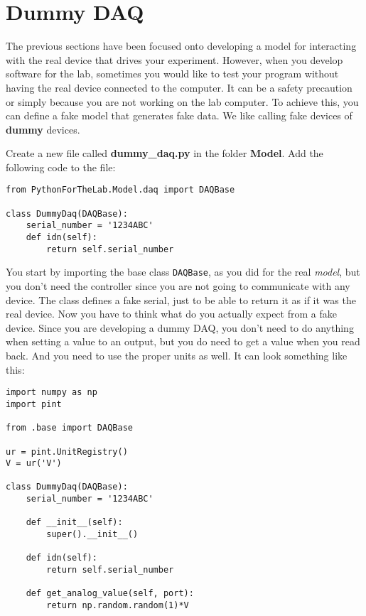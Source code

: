 \section{Dummy DAQ}\label{dummy-daq}
The previous sections have been focused onto developing a model for interacting with the real device that drives your experiment. However, when you develop software for the lab, sometimes you would like to test your program without having the real device
connected to the computer. It can be a safety precaution or simply because you are not working on the lab computer. To achieve this, you
can define a fake model that generates fake data. We like calling fake devices of \textbf{dummy} devices. 

Create a new file called \textbf{dummy\_daq.py} in the folder \textbf{Model}. Add the following code to the file:

\begin{verbatim}
from PythonForTheLab.Model.daq import DAQBase

class DummyDaq(DAQBase):
    serial_number = '1234ABC'
    def idn(self):
        return self.serial_number
\end{verbatim}

You start by importing the base class \texttt{DAQBase}, as you did for
the real \emph{model}, but you don't need the controller since you are
not going to communicate with any device. The class defines a fake
serial, just to be able to return it as if it was the real device. Now
you have to think what do you actually expect from a fake device. Since
you are developing a dummy {DAQ}, you don't need to do anything when
setting a value to an output, but you do need to get a value when you
read back. And you need to use the proper units as well. It can look
something like this:

\begin{verbatim}
import numpy as np
import pint

from .base import DAQBase

ur = pint.UnitRegistry()
V = ur('V')

class DummyDaq(DAQBase):
    serial_number = '1234ABC'
    
    def __init__(self):
        super().__init__()
    
    def idn(self):
        return self.serial_number
    
    def get_analog_value(self, port):
        return np.random.random(1)*V
\end{verbatim}

